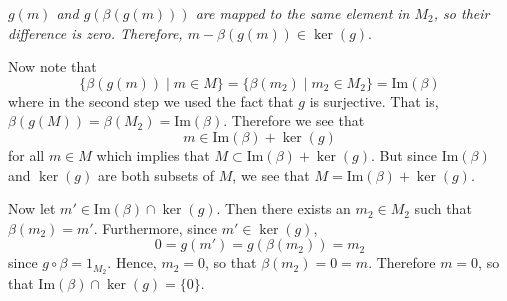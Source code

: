 \documentclass[12pt,letterpaper]{algebra_book}
\newcommand{\im}{\mbox{Im}}
\theoremstyle{definition}
\begin{document}
\begin{prf}
\begin{description}
\begin{center}

            \textit{$g(m)$ and $g(\beta(g(m)))$ are mapped to the same element in $M_2$, so their difference is zero. Therefore, $m - \beta(g(m)) \in \ker(g).$}

        \end{center}
        
        Now note that 
        \[
            \{ \beta(g(m)) \mid m \in M\} = \{\beta(m_2) \mid m_2 \in M_2\} = \im(\beta)
        \]
        where in the second step we used the fact that $g$ is
        surjective. That is, $\beta(g(M)) = \beta(M_2) = \im(\beta)$. Therefore we see that 
        \[ 
            m \in \im(\beta) + \ker(g)
        \]
        for all $m \in M$ which implies that 
        $M \subset \im(\beta) + \ker(g)$. But since $\im(\beta)$
        and $\ker(g)$ are both subsets of $M$, we see that $M =
        \im(\beta) + \ker(g)$. 

        Now let $m' \in \im(\beta) \cap \ker(g)$. Then there
        exists an $m_2 \in M_2$ such that $\beta(m_2) = m'$.
        Furthermore, since $m' \in \ker(g)$, 
        \[
            0 = g(m') = g(\beta(m_2)) = m_2
        \]
        since $g \circ \beta = 1_{M_2}$. Hence, $m_2 = 0$, so that
        $\beta(m_2) = 0 = m$. Therefore $m = 0$, so that
        $\im(\beta) \cap \ker(g) = \{0\}$. 
        \begin{center}
\end{center}
\end{description}
\end{prf}
\end{document}
